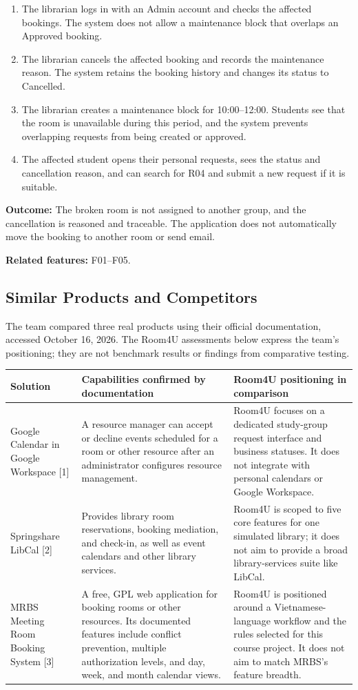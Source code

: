 \begin{enumerate}
  \item The librarian logs in with an Admin account and checks the affected bookings. The system does not allow a maintenance block that overlaps an Approved booking.
  \item The librarian cancels the affected booking and records the maintenance reason. The system retains the booking history and changes its status to Cancelled.
  \item The librarian creates a maintenance block for 10:00--12:00. Students see that the room is unavailable during this period, and the system prevents overlapping requests from being created or approved.
  \item The affected student opens their personal requests, sees the status and cancellation reason, and can search for R04 and submit a new request if it is suitable.
\end{enumerate}

\textbf{Outcome:} The broken room is not assigned to another group, and the cancellation is reasoned and traceable. The application does not automatically move the booking to another room or send email.

\textbf{Related features:} F01--F05.

\subsection{Similar Products and Competitors}
The team compared three real products using their official documentation, accessed October 16, 2026. The Room4U assessments below express the team's positioning; they are not benchmark results or findings from comparative testing.

\begin{tabularx}{\textwidth}{@{}L{0.21\textwidth}L{0.38\textwidth}Y@{}}
\toprule
Solution & Capabilities confirmed by documentation & Room4U positioning in comparison \\
\midrule
Google Calendar in Google Workspace [1] & A resource manager can accept or decline events scheduled for a room or other resource after an administrator configures resource management. & Room4U focuses on a dedicated study-group request interface and business statuses. It does not integrate with personal calendars or Google Workspace. \\
Springshare LibCal [2] & Provides library room reservations, booking mediation, and check-in, as well as event calendars and other library services. & Room4U is scoped to five core features for one simulated library; it does not aim to provide a broad library-services suite like LibCal. \\
MRBS Meeting Room Booking System [3] & A free, GPL web application for booking rooms or other resources. Its documented features include conflict prevention, multiple authorization levels, and day, week, and month calendar views. & Room4U is positioned around a Vietnamese-language workflow and the rules selected for this course project. It does not aim to match MRBS's feature breadth. \\
\bottomrule
\end{tabularx}


